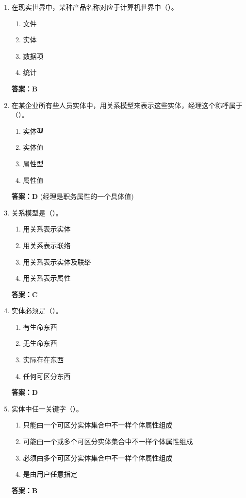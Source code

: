 \documentclass[12pt, a4paper]{article}
\begin{document}
\begin{enumerate}[label=\arabic*.]
    \item 在现实世界中，某种产品名称对应于计算机世界中（\quad）。
    \begin{enumerate}
        \item 文件
        \item 实体
        \item 数据项
        \item 统计
    \end{enumerate}
    \textbf{答案：B}

    \item 在某企业所有些人员实体中，用关系模型来表示这些实体，经理这个称呼属于（\quad）。
    \begin{enumerate}
        \item 实体型
        \item 实体值
        \item 属性型
        \item 属性值
    \end{enumerate}
    \textbf{答案：D} (经理是职务属性的一个具体值)

    \item 关系模型是（\quad）。
    \begin{enumerate}
        \item 用关系表示实体
        \item 用关系表示联络
        \item 用关系表示实体及联络
        \item 用关系表示属性
    \end{enumerate}
    \textbf{答案：C}

    \item 实体必须是（\quad）。
    \begin{enumerate}
        \item 有生命东西
        \item 无生命东西
        \item 实际存在东西
        \item 任何可区分东西
    \end{enumerate}
    \textbf{答案：D}

    \item 实体中任一关键字（\quad）。
    \begin{enumerate}
        \item 只能由一个可区分实体集合中不一样个体属性组成
        \item 可能由一个或多个可区分实体集合中不一样个体属性组成
        \item 必须由多个可区分实体集合中不一样个体属性组成
        \item 是由用户任意指定
    \end{enumerate}
    \textbf{答案：B}


\end{enumerate}
\end{document}

